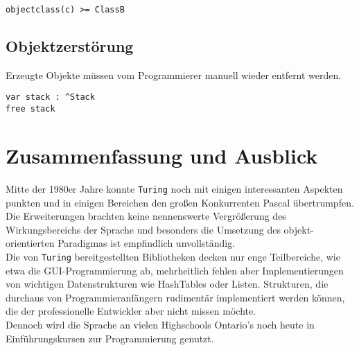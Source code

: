 \begin{table}[h!]
\begin{lstlisting}
objectclass(c) >= ClassB
\end{lstlisting}
\end{table}

\newpage

\subsection{Objektzerst\"orung}
\label{object }
Erzeugte Objekte m\"ussen vom Programmierer manuell wieder entfernt werden. 

\lstset{label=LIS:stack:free}
\begin{table}[h!]
\begin{lstlisting}
var stack : ^Stack
free stack
\end{lstlisting}
\end{table}

\section{Zusammenfassung und Ausblick}

Mitte der 1980er Jahre konnte \texttt{Turing} noch mit einigen interessanten Aspekten punkten und in einigen Bereichen den gro\ss{}en Konkurrenten Pascal \"ubertrumpfen. Die Erweiterungen brachten keine nennenswerte Vergr\"o\ss{}erung des Wirkungsbereichs der Sprache und besonders die Umsetzung des objekt-orientierten Paradigmas ist empfindlich unvollst\"andig. \\
Die von \texttt{Turing} bereitgestellten Bibliotheken decken nur enge Teilbereiche, wie etwa die GUI-Programmierung ab, mehrheitlich fehlen aber Implementierungen von wichtigen Datenstrukturen wie HashTables oder Listen. Strukturen, die durchaus von Programmieranf\"angern rudiment\"ar implementiert werden k\"onnen, die der professionelle Entwickler aber nicht missen m\"ochte. \\

Dennoch wird die Sprache an vielen Highschools Ontario's noch heute in Einf\"uhrungskursen zur Programmierung genutzt. 
